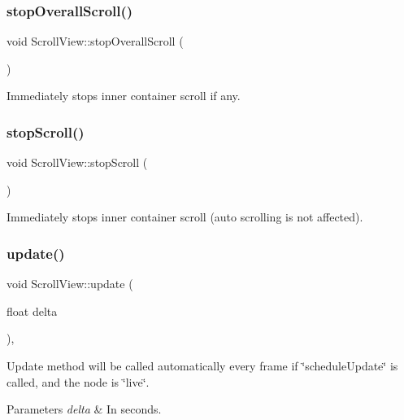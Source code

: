 \subsubsection{\texorpdfstring{stop\+Overall\+Scroll()}{stopOverallScroll()}}
{\footnotesize\ttfamily void Scroll\+View\+::stop\+Overall\+Scroll (\begin{DoxyParamCaption}{ }\end{DoxyParamCaption})\hspace{0.3cm}{\ttfamily [virtual]}}

Immediately stops inner container scroll if any. \mbox{\label{classui_1_1ScrollView_a6635856a03fd07b49040f2b449536556}} 
\subsubsection{\texorpdfstring{stop\+Scroll()}{stopScroll()}}
{\footnotesize\ttfamily void Scroll\+View\+::stop\+Scroll (\begin{DoxyParamCaption}{ }\end{DoxyParamCaption})\hspace{0.3cm}{\ttfamily [virtual]}}

Immediately stops inner container scroll (auto scrolling is not affected). \mbox{\label{classui_1_1ScrollView_a15b50cbbccdeff8dd34e8d0ab6ea82f7}} 
\subsubsection{\texorpdfstring{update()}{update()}\hspace{0.1cm}{\footnotesize\ttfamily [1/2]}}
{\footnotesize\ttfamily void Scroll\+View\+::update (\begin{DoxyParamCaption}\item[{float}]{delta }\end{DoxyParamCaption})\hspace{0.3cm}{\ttfamily [override]}, {\ttfamily [virtual]}}

Update method will be called automatically every frame if \char`\"{}schedule\+Update\char`\"{} is called, and the node is \char`\"{}live\char`\"{}. 
\begin{DoxyParams}{Parameters}
{\em delta} & In seconds. \\
\hline
\end{DoxyParams}


